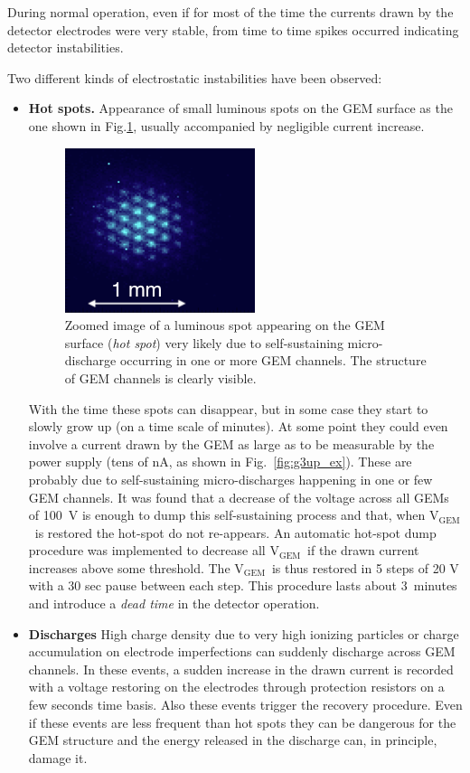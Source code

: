 \documentclass[a4paper,11pt]{article}
\newcommand{\Vg}  {V$_{\mathrm{GEM}}$}
\begin{document}
During normal operation, even if for most of the time the currents drawn by the detector electrodes were very stable, 
from time to time spikes occurred indicating detector instabilities.

Two different kinds of electrostatic instabilities have been observed:

\begin{itemize}
\item {\bf Hot spots.} Appearance of small luminous spots on the GEM surface as the one shown in Fig.\ref{fig:hotspot}, usually accompanied by negligible current increase.
\begin{figure}[ht]
	\centering
	\includegraphics[width=0.39\linewidth]{Figures/hot_spot.png}
  	\caption{Zoomed image of a luminous spot appearing on the GEM surface ({\it hot spot}) very likely due to self-sustaining micro-discharge occurring in one or more GEM channels. The structure of GEM channels is clearly visible.}
  	\label{fig:hotspot}
\end{figure}

With the time these spots can disappear, but in some case they start to slowly grow up (on a time scale of minutes). At some point they could even involve a current drawn by the GEM as large as to be measurable by the power supply (tens of nA, as shown in Fig.~\ref{fig:g3up_ex}). These are probably due to self-sustaining micro-discharges happening in one or few GEM channels. It was found that a decrease of the voltage across all GEMs of 100~V is enough to dump this self-sustaining process and that, when \Vg\ is restored the hot-spot do not re-appears. An automatic hot-spot dump procedure was implemented to decrease all \Vg\ if the drawn current increases above some threshold. The \Vg\ is thus restored in 5 steps of 20 V with a 30 sec pause between each step. This procedure lasts about 3~minutes and introduce a {\it dead time} in the detector operation.


\item{\bf Discharges} High charge density due to very high ionizing particles or charge accumulation on electrode imperfections can suddenly discharge across GEM channels. In these events, a sudden increase in the drawn current is recorded with a voltage restoring on the electrodes through protection resistors on a few seconds time basis. Also these events trigger the recovery procedure.
Even if these events are less frequent than hot spots 
they can be dangerous for the GEM structure and the energy released in the discharge can, in principle, damage it.

\end{itemize}
\end{document}
